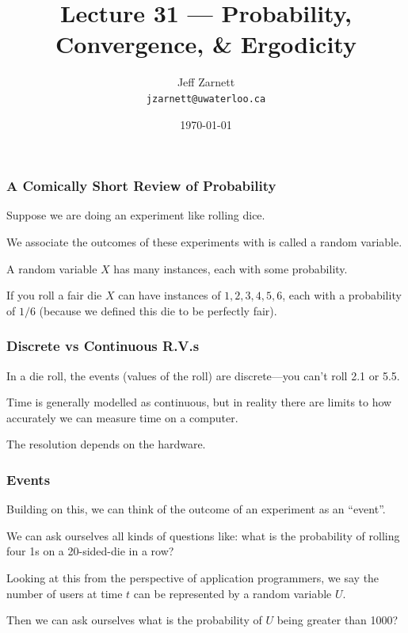 

\title{Lecture 31 --- Probability, Convergence, \& Ergodicity}

\author{Jeff Zarnett\\ \small \texttt{jzarnett@uwaterloo.ca}}
\date{\today}




\begin{frame}
  \titlepage

 \end{frame}



\begin{frame}
\frametitle{A Comically Short Review of Probability}

Suppose we are doing an experiment like rolling dice.

We associate the outcomes of these experiments with is called a random variable.

A random variable $X$ has many instances, each with some probability.

If you roll a fair die $X$ can have instances of ${1, 2, 3, 4, 5, 6}$, each with a probability of $1/6$ (because we defined this die to be perfectly fair).


\end{frame}



\begin{frame}
\frametitle{Discrete vs Continuous R.V.s}

In a die roll, the events (values of the roll) are discrete---you can't roll 2.1 or 5.5.

Time is generally modelled as continuous, but in reality there are limits to how accurately we can measure time on a computer. 

The resolution depends on the hardware. 

\end{frame}



\begin{frame}
\frametitle{Events}

Building on this, we can think of the outcome of an experiment as an ``event''. 

We can ask ourselves all kinds of questions like: what is the probability of rolling four 1s on a 20-sided-die in a row?

Looking at this from the perspective of application programmers, we say the number of users at time $t$ can be represented by a random variable $U$. 

Then we can ask ourselves what is the probability of $U$ being greater than 1000?

\end{frame}



